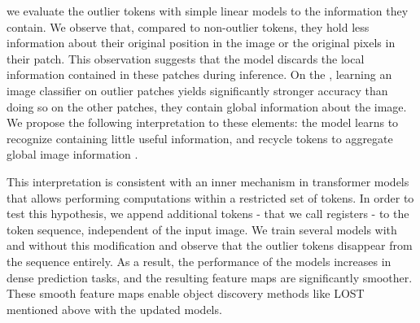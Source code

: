   we evaluate the outlier tokens with simple linear models to  the information they contain.
We observe that, compared to non-outlier tokens, they hold less information about their original position in the image or the original pixels in their patch.
This observation suggests that the model discards the local information contained in these patches during inference. 
On the , learning an image classifier on outlier patches yields significantly stronger accuracy than doing so on the other patches, 
 they contain global information about the image. 
We propose the following interpretation to these elements:
the model learns to recognize  containing little useful information, and recycle  tokens to aggregate global image information .

This interpretation is consistent with an inner mechanism in transformer models that allows performing computations within a restricted set of tokens. 
In order to test this hypothesis, we append additional tokens - that we call registers - to the token sequence, independent of the input image. 
We train several models with and without this modification and observe that the outlier tokens disappear from the sequence entirely. 
As a result, the performance of the models increases in dense prediction tasks, and the resulting feature maps are significantly smoother.
These smooth feature maps enable object discovery methods like LOST mentioned above with the updated models.

